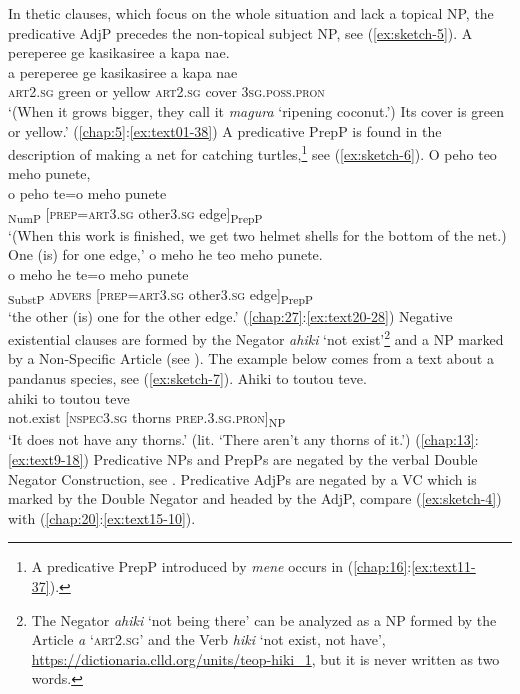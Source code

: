 \documentclass[output=paper]{langscibook}
\begin{document}
In thetic clauses, which focus on the whole situation and lack a topical NP, the predicative AdjP precedes the non-topical subject NP, see (\ref{ex:sketch-5}).
\ea\label{ex:sketch-5}
    A pereperee ge kasikasiree a kapa nae.\\
    \gll a	pereperee	ge	kasikasiree	a	kapa	nae\\
    \textsc{art}2.\textsc{sg}	green	or	yellow	\textsc{art}2.\textsc{sg}	cover	3\textsc{sg}.\textsc{poss}.\textsc{pron}\\
    \glt `(When it grows bigger, they call it \textit{magura} `ripening coconut.') Its cover is green or yellow.' (\ref{chap:5}:\ref{ex:text01-38})
\z
A predicative PrepP is found in the description of making a net for catching turtles,\footnote{A predicative PrepP introduced by \textit{mene} occurs in (\ref{chap:16}:\ref{ex:text11-37}).} see (\ref{ex:sketch-6}). 
\ea\label{ex:sketch-6}
    \ea\label{ex:sketch-6a}
    O peho teo meho punete,\\
    \gll o	peho	te=o	meho	punete\\
    [\textsc{art}3.\textsc{sg}	one3.\textsc{sg}]\textsubscript{NumP}	[\textsc{prep}=\textsc{art}3.\textsc{sg}	other3.\textsc{sg}	edge]\textsubscript{PrepP}\\
    \glt `(When this work is finished, we get two helmet shells for the bottom of the net.) One (is) for one edge,'
    \ex\label{ex:sketch-6b}
    o meho he teo meho punete.\\
    \gll o	meho	he	te=o	meho	punete\\
    [\textsc{art}3.\textsc{sg}	other3.\textsc{sg}]\textsubscript{SubstP}	\textsc{advers}	[\textsc{prep}=\textsc{art}3.\textsc{sg}	other3.\textsc{sg}	edge]\textsubscript{PrepP}\\
    \glt `the other (is) one for the other edge.' (\ref{chap:27}:\ref{ex:text20-28})
    \z
\z
Negative existential clauses are formed by the Negator \textit{ahiki} `not exist'\footnote{The Negator \textit{ahiki} `not being there' can be analyzed as a NP formed by the Article \textit{a} `\textsc{art}2.\textsc{sg}' and the Verb \textit{hiki} `not exist, not have', \url{https://dictionaria.clld.org/units/teop-hiki_1}, but it is never written as two words.} and a NP marked by a Non-Specific Article (see ). The example below comes from a text about a pandanus species, see (\ref{ex:sketch-7}).
\ea\label{ex:sketch-7}
    Ahiki to toutou teve.\\
    \gll ahiki	to	toutou	teve\\
    not.exist	[\textsc{nspec}3.\textsc{sg}	thorns	\textsc{prep}.3.\textsc{sg}.\textsc{pron}]\textsubscript{NP}\\
    \glt `It does not have any thorns.' (lit. `There aren't any thorns of it.') (\ref{chap:13}:\ref{ex:text9-18})
\z
Predicative NPs and PrepPs are negated by the verbal Double Negator Construction, see . Predicative AdjPs are negated by a VC which is marked by the Double Negator and headed by the AdjP, compare (\ref{ex:sketch-4}) with (\ref{chap:20}:\ref{ex:text15-10}).
\end{document}
